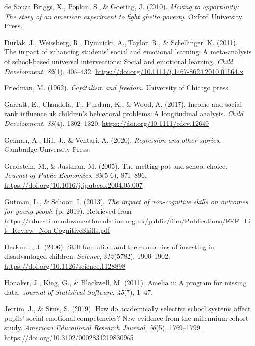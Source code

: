 \documentclass[
  english,
  man]{apa6}
\newlength{\cslhangindent}
\newenvironment{cslreferences}%
  {\setlength{\parindent}{0pt}%
  \everypar{\setlength{\hangindent}{\cslhangindent}}\ignorespaces}%
  {\par}
\begin{document}
\begin{cslreferences}
\leavevmode\hypertarget{ref-desouzabriggs2010}{}%
de Souza Briggs, X., Popkin, S., \& Goering, J. (2010). \emph{Moving to opportunity: The story of an american experiment to fight ghetto poverty}. Oxford University Press.

\leavevmode\hypertarget{ref-durlak2011}{}%
Durlak, J., Weissberg, R., Dymnicki, A., Taylor, R., \& Schellinger, K. (2011). The impact of enhancing students' social and emotional learning: A meta-analysis of school-based universal interventions: Social and emotional learning. \emph{Child Development}, \emph{82}(1), 405--432. \url{https://doi.org/10.1111/j.1467-8624.2010.01564.x}

\leavevmode\hypertarget{ref-friedman1962}{}%
Friedman, M. (1962). \emph{Capitalism and freedom}. University of Chicago press.

\leavevmode\hypertarget{ref-garratt2017}{}%
Garratt, E., Chandola, T., Purdam, K., \& Wood, A. (2017). Income and social rank influence uk children's behavioral problems: A longitudinal analysis. \emph{Child Development}, \emph{88}(4), 1302--1320. \url{https://doi.org/10.1111/cdev.12649}

\leavevmode\hypertarget{ref-gelman2020regression}{}%
Gelman, A., Hill, J., \& Vehtari, A. (2020). \emph{Regression and other stories}. Cambridge University Press.

\leavevmode\hypertarget{ref-gradstein2005}{}%
Gradstein, M., \& Justman, M. (2005). The melting pot and school choice. \emph{Journal of Public Economics}, \emph{89}(5-6), 871--896. \url{https://doi.org/10.1016/j.jpubeco.2004.05.007}

\leavevmode\hypertarget{ref-gutman2013}{}%
Gutman, L., \& Schoon, I. (2013). \emph{The impact of non-cognitive skills on outcomes for young people} (p. 2019). Retrieved from \url{https://educationendowmentfoundation.org.uk/public/files/Publications/EEF_Lit_Review_Non-CognitiveSkills.pdf}

\leavevmode\hypertarget{ref-heckman2006}{}%
Heckman, J. (2006). Skill formation and the economics of investing in disadvantaged children. \emph{Science}, \emph{312}(5782), 1900--1902. \url{https://doi.org/10.1126/science.1128898}

\leavevmode\hypertarget{ref-honaker2011}{}%
Honaker, J., King, G., \& Blackwell, M. (2011). Amelia ii: A program for missing data. \emph{Journal of Statistical Software}, \emph{45}(7), 1--47.

\leavevmode\hypertarget{ref-jerrim2019}{}%
Jerrim, J., \& Sims, S. (2019). How do academically selective school systems affect pupils' social-emotional competencies? New evidence from the millennium cohort study. \emph{American Educational Research Journal}, \emph{56}(5), 1769--1799. \url{https://doi.org/10.3102/0002831219830965}


\end{cslreferences}
\end{document}
